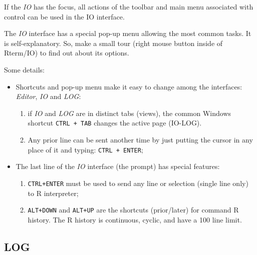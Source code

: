 If the \textit{IO} has the focus, all actions of the \RR{} toolbar and main menu
associated with control \RR{} can be used in the IO interface.

The \textit{IO} interface has a special pop-up menu allowing the most common
tasks. It is self-explanatory. So, make a small tour (right mouse button inside
of Rterm/IO) to find out about its options.

Some details:

\begin{itemize}
  \item Shortcuts and pop-up menu make it easy to change among the interfaces:
    \textit{Editor}, \textit{IO} and \textit{LOG}:
    \begin{enumerate}
      \item if \textit{IO} and \textit{LOG} are in distinct tabs (views), the
        common Windows shortcut \texttt{CTRL + TAB} changes the active page (IO-LOG).
      \item Any prior line can be sent another time by just putting the cursor
        in any place of it and typing: \texttt{CTRL + ENTER};
    \end{enumerate}
  \item The last line of the \textit{IO} interface (the prompt) has special features:
    \begin{enumerate}
      \item \texttt{CTRL+ENTER} must be used to send any line or selection (single line only) to R interpreter;
      \item \texttt{ALT+DOWN} and \texttt{ALT+UP} are the shortcuts (prior/later)
        for command R history. The R history is continuous, cyclic, and have a 100
        line limit.
    \end{enumerate}
\end{itemize}


\hypertarget{working_rterm_log}{}
\subsection{LOG}

